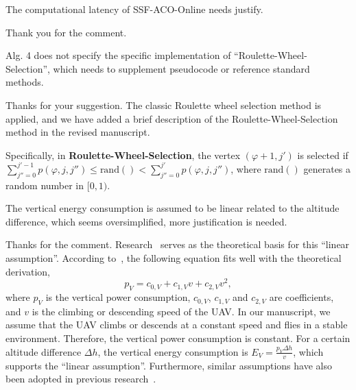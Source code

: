 \reviewer

\begin{revcomment} %
	The computational latency of SSF-ACO-Online needs justify.
\end{revcomment}
\begin{revresponse}
	Thank you for the comment.
\end{revresponse}

\begin{revcomment}
	Alg. 4 does not specify the specific implementation of ``Roulette-Wheel-Selection'', which needs to supplement pseudocode or reference standard methods.
\end{revcomment}
\begin{revresponse}
	Thanks for your suggestion.
	The classic Roulette wheel selection method is applied, and we have added a brief description of the Roulette-Wheel-Selection method in the revised manuscript.
	\begin{changes}
		Specifically, in \textbf{Roulette-Wheel-Selection}, the vertex $(\varphi+1, j')$ is selected if $\sum_{j''=0}^{j'-1}{p(\varphi,j,j'')}\leq \text{rand}() < \sum_{j''=0}^{j'}{p(\varphi,j,j'')}$, where $\text{rand}()$ generates a random number in $[0,1)$.
	\end{changes}
\end{revresponse}

\begin{revcomment}
	The vertical energy consumption is assumed to be linear related to the altitude difference, which seems oversimplified, more justification is needed.
\end{revcomment}
\begin{revresponse}
	Thanks for the comment.
	Research~\cite{vertical-assumption} serves as the theoretical basis for this ``linear assumption''.
	According to~\cite{vertical-assumption}, the following equation fits well with the theoretical derivation,
	\begin{equation}
		p_V = c_{0,V} + c_{1,V}v + c_{2,V}v^2,
	\end{equation}
	where $p_V$ is the vertical power consumption, $c_{0,V}$, $c_{1,V}$ and $c_{2,V}$ are coefficients, and $v$ is the climbing or descending speed of the UAV.
	In our manuscript, we assume that the UAV climbs or descends at a constant speed and flies in a stable environment.
	Therefore, the vertical power consumption is constant.
	For a certain altitude difference $\Delta h$, the vertical energy consumption is $E_V=\frac{p_V\Delta h}{v}$, which supports the ``linear assumption''.
	Furthermore, similar assumptions have also been adopted in previous research~\cite{mgh}.
\end{revresponse}

